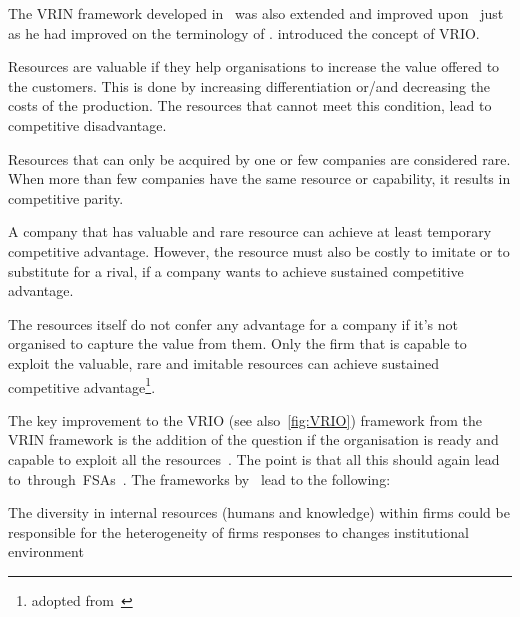 The VRIN framework developed in~\cite{Barney:1991ur} was also extended and improved upon~\cite{Barney:1995tz} just as he had improved on the terminology of \rbt.
\cite{Barney:1995tz} introduced the concept of VRIO\@.
\begin{description} 
   \setlength{\itemsep}{1pt}
\item[The Question of Value] Resources are valuable if they help organisations to increase the value offered to the customers. This is done by increasing differentiation or/and decreasing the costs of the production. The resources that cannot meet this condition, lead to competitive disadvantage.

\item[The Question of Rarity] Resources that can only be acquired by one or few companies are considered rare. When more than few companies have the same resource or capability, it results in competitive parity.

\item[The Question of Imitability] A company that has valuable and rare resource can achieve at least temporary competitive advantage. However, the resource must also be costly to imitate or to substitute for a rival, if a company wants to achieve sustained competitive advantage.

\item[The Question of Organisation] The resources itself do not confer any advantage for a company if it’s not organised to capture the value from them. Only the firm that is capable to exploit the valuable, rare and imitable resources can achieve sustained competitive advantage\footnote{adopted from~\citep{Strategic-management-insight:2013}}.
\end{description}

The key improvement to the VRIO (see also~\ref{fig:VRIO}) framework from the VRIN framework is the addition of the question if the organisation is ready and capable to exploit all the resources~\citep{Barney:1995tz,Strategic-management-insight:2013}.
The point is that all this should again lead to~\ca through~\glspl{FSA}~\citep{Barney:1991ur,Barney:2001tj,Barney:2011jp}. 
The frameworks by~\citep{Barney:1991ur,Barney:1995tz} lead to the following:

\begin{WP}\label{wp:rbt}
  The diversity in internal resources (humans and knowledge) within firms could be responsible for the heterogeneity of firms responses to changes institutional environment
\end{WP}

